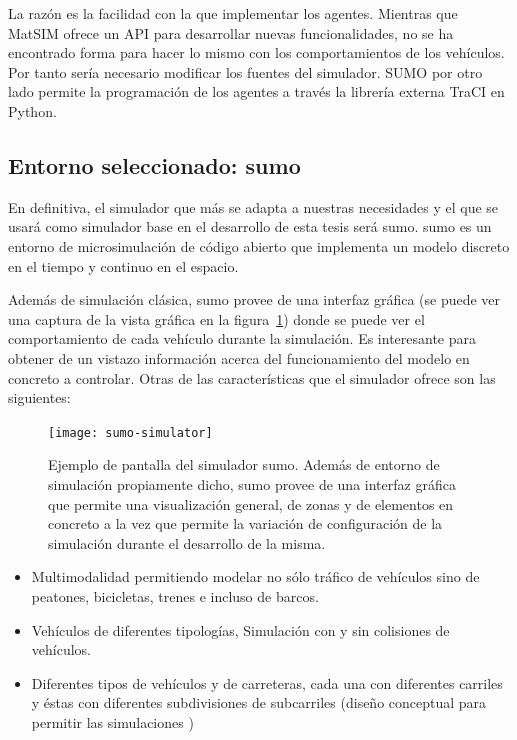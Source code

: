 {La razón es la facilidad con la que implementar los agentes. Mientras que MatSIM ofrece un API para desarrollar nuevas funcionalidades, no se ha encontrado forma para hacer lo mismo con los comportamientos de los vehículos. Por tanto sería necesario modificar los fuentes del simulador. SUMO por otro lado permite la programación de los agentes a través la librería externa TraCI en Python.

\subsection{Entorno seleccionado: \acrshort{sumo}}

En definitiva, el simulador que más se adapta a nuestras necesidades y el que se usará como simulador base en el desarrollo de esta tesis será \gls{sumo}. \gls{sumo} es un entorno de microsimulación de código abierto que implementa un modelo discreto en el tiempo y continuo en el espacio.

Además de simulación clásica, \gls{sumo} provee de una interfaz gráfica (se puede ver una captura de la vista gráfica en la figura~\ref{fig:sumo-simulator}) donde se puede ver el comportamiento de cada vehículo durante la simulación. Es interesante para obtener de un vistazo información acerca del funcionamiento del modelo en concreto a controlar. Otras de las características que el simulador ofrece son las siguientes:

\begin{figure}
	\texttt{[image: sumo-simulator]}
	\caption{Ejemplo de pantalla del simulador \gls{sumo}. Además de entorno de simulación propiamente dicho, \gls{sumo} provee de una interfaz gráfica que permite una visualización general, de zonas y de elementos en concreto a la vez que permite la variación de configuración de la simulación durante el desarrollo de la misma.}
	\label{fig:sumo-simulator}
\end{figure}

\begin{itemize}
	\item Multimodalidad permitiendo modelar no sólo tráfico de vehículos sino de peatones, bicicletas, trenes e incluso de barcos.
	\item Vehículos de diferentes tipologías, Simulación con y sin colisiones de vehículos.
	\item Diferentes tipos de vehículos y de carreteras, cada una con diferentes carriles y éstas con diferentes subdivisiones de subcarriles (diseño conceptual para permitir las simulaciones )
\end{itemize}

}
